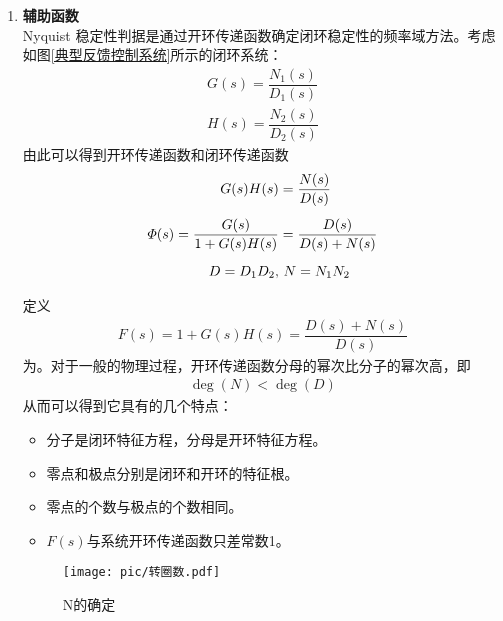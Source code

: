 \begin{enumerate}[1.]
	\item \textbf{辅助函数}\\
	\hspace*{2em}Nyquist 稳定性判据是通过开环传递函数确定闭环稳定性的频率域方法。考虑如图\ref{典型反馈控制系统}所示的闭环系统：
	\begin{align}
		G(s) = \dfrac{N_1(s)}{D_1(s)}\\[0.5em]
		H(s) = \dfrac{N_2(s)}{D_2(s)}
	\end{align}
	由此可以得到开环传递函数和闭环传递函数
	\begin{align}
		G(s)H(s) &= \dfrac{N(s)}{D(s)}\\[0.5em]
		\varPhi(s) = \dfrac{G(s)}{1 + G(s)H(s)} &= \dfrac{D(s)}{D(s) + N(s)}\\[0.5em]
		D= D_1D_2,& \,\,N = N_1N_2\notag
	\end{align}

	\hspace*{2em}定义
	\begin{align}
		F(s) = 1 + G(s)H(s) = \dfrac{D(s) + N(s)}{D(s)}
	\end{align}
	为。对于一般的物理过程，开环传递函数分母的幂次比分子的幂次高，即
	\begin{align*}
		\deg(N) < \deg(D)
	\end{align*}
	从而可以得到它具有的几个特点：
	\begin{itemize}
		\item 分子是闭环特征方程，分母是开环特征方程。
		\item 零点和极点分别是闭环和开环的特征根。
		\item 零点的个数与极点的个数相同。
		\item $F(s)$与系统开环传递函数只差常数1。
	\end{itemize}
	\vspace*{1em}

			
\begin{figure}[!htb]
	\centering
	\texttt{[image: pic/转圈数.pdf]}
	\caption{N的确定}
	\label{转圈数}
\end{figure}


\end{enumerate}
